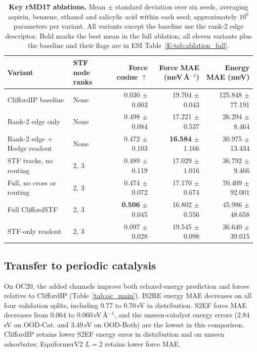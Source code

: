 \begin{table}[t]
\centering
\caption{\textbf{Key rMD17 ablations.} Mean $\pm$ standard deviation over six seeds, averaging aspirin, benzene, ethanol and salicylic acid within each seed; approximately $10^6$ parameters per variant. All variants except the baseline use the rank-2 edge descriptor. Bold marks the best mean in the full ablation; all eleven variants plus the baseline and their flags are in ESI Table~\ref{E-tab:ablation_full}.}
\label{tab:ablation}
\fontsize{8.5}{10}\selectfont
\setlength{\tabcolsep}{3pt}
\begin{tabular*}{\textwidth}{@{\extracolsep{\fill}}llrrr@{}}
\toprule
Variant & STF node ranks & Force cosine $\uparrow$ & Force MAE (meV\,\AA$^{-1}$) & Energy MAE (meV) \\
\midrule
CliffordIP baseline & None & 0.030 $\pm$ 0.003 & 19.704 $\pm$ 0.043 & 125.848 $\pm$ 77.191 \\
Rank-2 edge only & None & 0.498 $\pm$ 0.084 & 17.221 $\pm$ 0.537 & 26.294 $\pm$ 8.464 \\
Rank-2 edge + Hodge readout & None & 0.472 $\pm$ 0.103 & \textbf{16.584} $\pm$ 1.166 & 30.975 $\pm$ 13.434 \\
STF tracks, no routing & 2, 3 & 0.489 $\pm$ 0.119 & 17.029 $\pm$ 1.016 & 36.792 $\pm$ 9.466 \\
Full, no cross or routing & 2, 3 & 0.474 $\pm$ 0.072 & 17.170 $\pm$ 0.674 & 70.409 $\pm$ 92.001 \\
Full CliffordSTF & 2, 3 & \textbf{0.506} $\pm$ 0.045 & 16.802 $\pm$ 0.556 & 45.986 $\pm$ 48.658 \\
STF-only readout & 2, 3 & 0.097 $\pm$ 0.028 & 19.545 $\pm$ 0.098 & 36.640 $\pm$ 39.015 \\
\bottomrule
\end{tabular*}
\end{table}

\subsection{Transfer to periodic catalysis}\label{sec:catalysis}

On OC20, the added channels improve both relaxed-energy prediction and forces relative to CliffordIP (Table~\ref{tab:oc_main}). IS2RE energy MAE decreases on all four validation splits, including $0.77$ to $0.70$\,eV in distribution. S2EF force MAE decreases from $0.064$ to $0.060$\,eV\,\AA$^{-1}$, and the unseen-catalyst energy errors ($2.84$\,eV on OOD-Cat. and $3.49$\,eV on OOD-Both) are the lowest in this comparison. CliffordIP retains lower S2EF energy error in distribution and on unseen adsorbates; EquiformerV2 $L{=}2$ retains lower force MAE.

